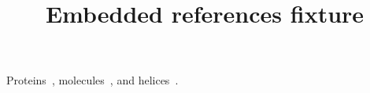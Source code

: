 \documentclass{ai4x}
\title{Embedded references fixture}
\begin{document}
\maketitle
Proteins~\cite{jumper2021alphafold}, molecules~\cite{schutt2017schnet}, and helices~\cite{special}.

\end{document}
